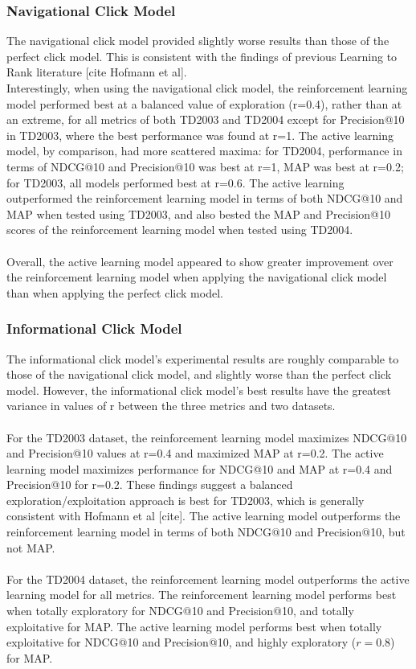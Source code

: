\documentclass{acm_proc_article-sp}
\begin{document}
\subsubsection{Navigational Click Model}
The navigational click model provided slightly worse results than those of the perfect click model.  This is consistent with the findings of previous Learning to Rank literature [cite Hofmann et al].\\
Interestingly, when using the navigational click model, the reinforcement learning model performed best at a balanced value of exploration (r=0.4), rather than at an extreme, for all metrics of both TD2003 and TD2004 except for Precision@10 in TD2003, where the best performance was found at r=1.  The active learning model, by comparison, had more scattered maxima:  for TD2004, performance in terms of NDCG@10 and Precision@10 was best at r=1, MAP was best at r=0.2; for TD2003, all models performed best at r=0.6.   The active learning outperformed the reinforcement learning model in terms of both NDCG@10 and MAP when tested using TD2003, and also bested the MAP and Precision@10 scores of the reinforcement learning model when tested using TD2004.  \\ \\
Overall, the active learning model appeared to show greater improvement over the reinforcement learning model when applying the navigational click model than when applying the perfect click model. 

\subsubsection{Informational Click Model}
The informational click model's experimental results are roughly comparable to those of the navigational click model, and slightly worse than the perfect click model.  However, the informational click model's best results have the greatest variance in values of r between the three metrics and two datasets.   \\ \\
For the TD2003 dataset, the reinforcement learning model maximizes NDCG@10 and Precision@10 values at r=0.4 and maximized MAP at r=0.2.  The active learning model maximizes performance for NDCG@10 and MAP at r=0.4 and Precision@10 for r=0.2.  These findings suggest a balanced exploration/exploitation approach is best for TD2003, which is generally consistent with Hofmann et al [cite].  The active learning model outperforms the reinforcement learning model in terms of both NDCG@10 and Precision@10, but not MAP. \\ \\
For the TD2004 dataset, the reinforcement learning model outperforms the active learning model for all metrics.  The reinforcement learning model performs best when totally exploratory for NDCG@10 and Precision@10, and totally exploitative for MAP.  The active learning model performs best when totally exploitative for NDCG@10 and Precision@10, and highly exploratory ($r=0.8$) for MAP.  
\end{document}
